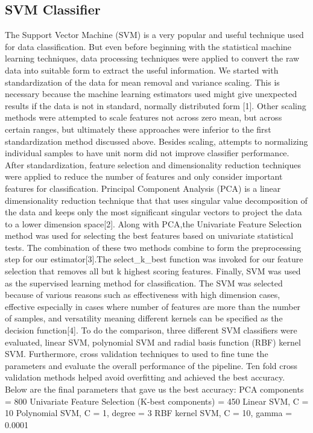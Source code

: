 \documentclass{article} %
\begin{document}
\subsection{SVM Classifier}
The Support Vector Machine (SVM) is a very popular and useful technique used for data classification. But even before beginning with the statistical machine learning techniques, data processing techniques were applied to convert the raw data into suitable form to extract the useful information. We started with standardization of the data for mean removal and variance scaling. This is necessary because the machine learning estimators used might give unexpected results if the data is not in standard, normally distributed form [1]. Other scaling methods were attempted to scale features not across zero mean, but across certain ranges, but ultimately these approaches were inferior to the first standardization method discussed above. Besides scaling, attempts to normalizing individual samples to have unit norm did not improve classifier performance. 
After standardization, feature selection and dimensionality reduction techniques were applied to reduce the number of features and only consider important features for classification. Principal Component Analysis (PCA) is a linear dimensionality reduction technique that that uses singular value decomposition of the data and keeps only the most significant singular vectors to project the data to a lower dimension space[2]. Along with PCA,the Univariate Feature Selection method was used for selecting the best features based on univariate statistical tests. The combination of these two methods combine to form the preprocessing step for our estimator[3].The select\_k\_best function was invoked for our feature selection that removes all but k highest scoring features.
Finally, SVM was used as the supervised learning method for classification. The SVM was selected because of various reasons such as effectiveness with high dimension cases, effective especially in cases where number of features are more than the number of samples, and versatility meaning different kernels can be specified as the decision function[4]. To do the comparison, three different SVM classifiers were evaluated, linear SVM, polynomial SVM and radial basis function (RBF) kernel SVM. Furthermore, cross validation techniques to used to fine tune the parameters and evaluate the overall performance of the pipeline. Ten fold cross validation methods helped avoid overfitting and achieved the best accuracy. Below are the final parameters that gave us the best accuracy:
PCA components = 800
Univariate Feature Selection (K-best components) = 450
Linear SVM, C = 10
Polynomial SVM, C = 1, degree = 3
RBF kernel SVM, C = 10, gamma = 0.0001
\end{document}
